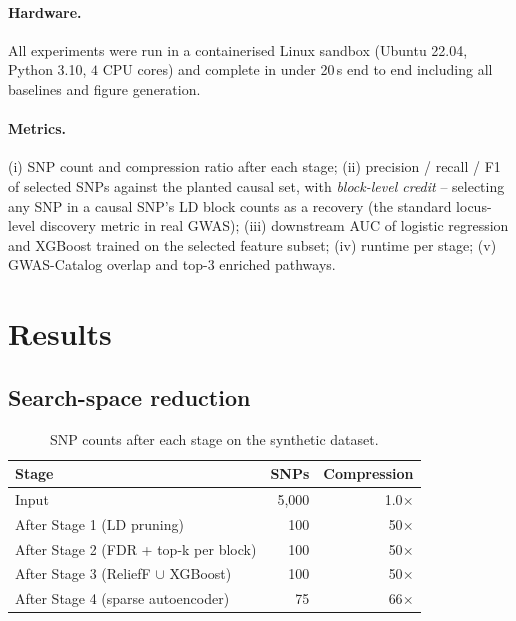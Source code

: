 \documentclass[11pt,a4paper]{article}
\begin{document}
\paragraph{Hardware.} All experiments were run in a containerised Linux
sandbox (Ubuntu 22.04, Python 3.10, $4$ CPU cores) and complete in under
20\,s end to end including all baselines and figure generation.

\paragraph{Metrics.} (i) SNP count and compression ratio after each
stage; (ii) precision / recall / F1 of selected SNPs against the planted
causal set, with \emph{block-level credit} -- selecting any SNP in a
causal SNP's LD block counts as a recovery (the standard locus-level
discovery metric in real GWAS); (iii) downstream AUC of logistic
regression and XGBoost trained on the selected feature subset; (iv)
runtime per stage; (v) GWAS-Catalog overlap and top-$3$ enriched
pathways.

\section{Results}

\subsection{Search-space reduction}

\begin{table}[H]
\centering
\caption{SNP counts after each stage on the synthetic dataset.
\label{tab:counts}}
\begin{tabular}{lrr}
\toprule
\textbf{Stage} & \textbf{SNPs} & \textbf{Compression} \\
\midrule
Input              & 5{,}000 & 1.0$\times$ \\
After Stage 1 (LD pruning) & 100 & 50$\times$ \\
After Stage 2 (FDR + top-k per block) & 100 & 50$\times$ \\
After Stage 3 (ReliefF $\cup$ XGBoost) & 100 & 50$\times$ \\
After Stage 4 (sparse autoencoder)     &  75 & 66$\times$ \\
\bottomrule
\end{tabular}
\end{table}
\end{document}

